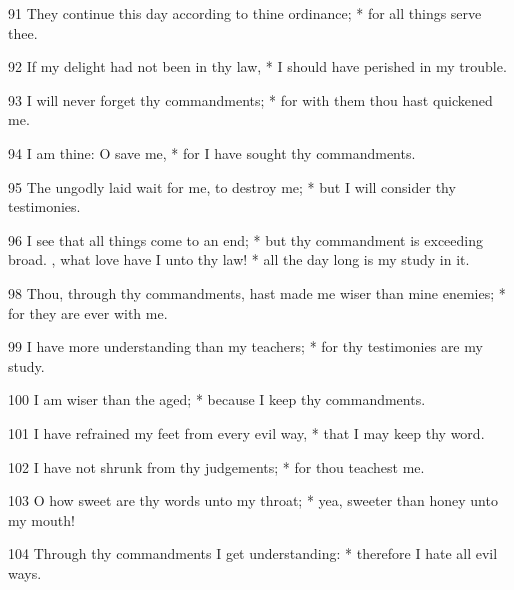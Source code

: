 91 They continue this day according to thine ordinance; * for all things serve thee.\par
92 If my delight had not been in thy law, * I should have perished in my trouble.\par
93 I will never forget thy commandments; * for with them thou hast quickened me.\par
94 I am thine: O save me, * for I have sought thy commandments.\par
95 The ungodly laid wait for me, to destroy me; * but I will consider thy testimonies.\par
96 I see that all things come to an end; * but thy commandment is exceeding broad.
, what love have I unto thy law! * all the day long is my study in it.\par
98 Thou, through thy commandments, hast made me wiser than mine enemies; * for they are ever with me.\par
99 I have more understanding than my teachers; * for thy testimonies are my study.\par
100 I am wiser than the aged; * because I keep thy commandments.\par
101 I have refrained my feet from every evil way, * that I may keep thy word.\par
102 I have not shrunk from thy judgements; * for thou teachest me.\par
103 O how sweet are thy words unto my throat; * yea, sweeter than honey unto my mouth!\par
104 Through thy commandments I get understanding: * therefore I hate all evil ways.
